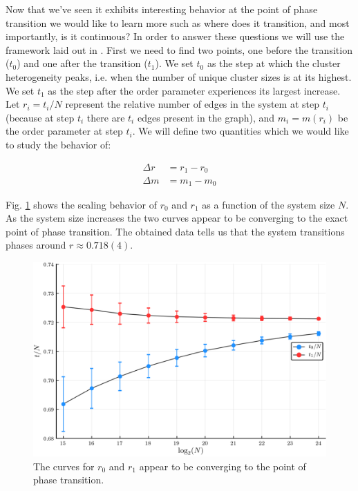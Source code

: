 Now that we've seen it exhibits interesting behavior at the point of phase transition we would like to learn more such as where does it transition, and most importantly, is it continuous?
In order to answer these questions we will use the framework laid out in \cite{Lee_1}.
First we need to find two points, one before the transition ($t_0$) and one after the transition ($t_1$).
We set $t_0$ as the step at which the cluster heterogeneity peaks, i.e. when the number of unique cluster sizes is at its highest.
We set $t_1$ as the step after the order parameter experiences its largest increase.
Let $r_i = t_i / N$ represent the relative number of edges in the system at step $t_i$ (because at step $t_i$ there are $t_i$ edges present in the graph), and $m_i = m(r_i)$ be the order parameter at step $t_i$.
We will define two quantities which we would like to study the behavior of:

\begin{equation}
\begin{split}
	\Delta r &= r_1 - r_0 \\
	\Delta m &= m_1 - m_0
\end{split}
\end{equation}

Fig. \ref{fig:r_scaling} shows the scaling behavior of $r_0$ and $r_1$ as a function of the system size $N$.
As the system size increases the two curves appear to be converging to the exact point of phase transition.
The obtained data tells us that the system transitions phases around $r \approx 0.718(4)$.

\begin{figure}[H]
	\centering
	\includegraphics[width=350pt, clip]{images/r_scaling.png}
	\caption{The curves for $r_0$ and $r_1$ appear to be converging to the point of phase transition.}
	\label{fig:r_scaling}
\end{figure}

